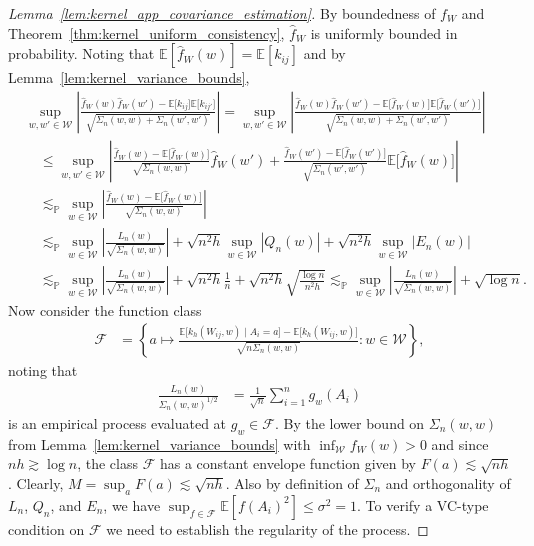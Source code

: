 \documentclass[11pt,lof]{puthesis}
\renewcommand{\P}{\ensuremath{\mathbb{P}}}
\newcommand{\E}{\ensuremath{\mathbb{E}}}
\newcommand{\cF}{\ensuremath{\mathcal{F}}}
\newcommand{\cW}{\ensuremath{\mathcal{W}}}
\theoremstyle{break}
\theoremstyle{proof}
\newtheorem{proof}{Proof}
\begin{document}
\begin{proof}[Lemma~\ref{lem:kernel_app_covariance_estimation}]
By boundedness of $f_W$ and
Theorem~\ref{thm:kernel_uniform_consistency},
$\hat f_W$ is uniformly bounded in probability.
Noting that
$\E[\hat f_W(w)] = \E[k_{i j}]$
and by Lemma~\ref{lem:kernel_variance_bounds},
%
\begin{align*}
&\sup_{w,w' \in \cW}
\left|
\frac{
\hat f_W(w) \hat f_W(w')
- \E\big[k_{i j}\big] \E\big[k_{i j'}\big]}
{\sqrt{\Sigma_n(w,w) + \Sigma_n(w',w')}}
\right|
=
\sup_{w,w' \in \cW}
\left|
\frac{
\hat f_W(w) \hat f_W(w')
- \E\big[\hat f_W(w)\big] \E\big[\hat f_W(w')\big]}
{\sqrt{\Sigma_n(w,w) + \Sigma_n(w',w')}}
\right| \\
&\quad\leq
\sup_{w,w' \in \cW}
\left|
\frac{\hat f_W(w) - \E\big[\hat f_W(w)\big]}
{\sqrt{\Sigma_n(w,w)}}
\hat f_W(w')
+ \frac{\hat f_W(w') - \E\big[\hat f_W(w')\big]}
{\sqrt{\Sigma_n(w',w')}}
\E\big[\hat f_W(w)]
\right| \\
&\quad\lesssim_\P
\sup_{w \in \cW}
\left|
\frac{\hat f_W(w) - \E\big[\hat f_W(w)\big]}
{\sqrt{\Sigma_n(w,w)}}
\right| \\
&\quad\lesssim_\P
\sup_{w \in \cW}
\left|
\frac{L_n(w)}
{\sqrt{\Sigma_n(w,w)}}
\right|
+ \sqrt{n^2h} \sup_{w \in \cW} \left| Q_n(w) \right|
+ \sqrt{n^2h} \sup_{w \in \cW} \left| E_n(w) \right| \\
&\quad\lesssim_\P
\sup_{w \in \cW}
\left|
\frac{L_n(w)}
{\sqrt{\Sigma_n(w,w)}}
\right|
+ \sqrt{n^2h} \frac{1}{n}
+ \sqrt{n^2h} \sqrt{\frac{\log n}{n^2h}}
\lesssim_\P
\sup_{w \in \cW}
\left|
\frac{L_n(w)}
{\sqrt{\Sigma_n(w,w)}}
\right|
+ \sqrt{\log n}.
\end{align*}
%
Now consider the function class
%
\begin{align*}
\cF
&=
\left\{
a \mapsto
\frac{
\E\big[k_h(W_{i j},w) \mid A_i = a \big]
- \E\big[k_h(W_{i j},w) \big]}
{\sqrt{n \Sigma_n(w,w)}}:
w \in \cW
\right\},
\end{align*}
%
noting that
%
\begin{align*}
\frac{L_n(w)}
{\Sigma_n(w,w)^{1/2}}
&=
\frac{1}{\sqrt n}
\sum_{i=1}^n
g_w(A_i)
\end{align*}
%
is an empirical process evaluated at
$g_w \in \cF$.
By the lower bound on $\Sigma_n(w,w)$
from Lemma~\ref{lem:kernel_variance_bounds}
with $\inf_\cW f_W(w) > 0$ and since $n h \gtrsim \log n$,
the class $\cF$ has a constant envelope function
given by $F(a) \lesssim \sqrt{n h}$.
Clearly, $M = \sup_a F(a) \lesssim \sqrt{n h}$.
Also by definition of $\Sigma_n$
and orthogonality of $L_n$, $Q_n$, and $E_n$,
we have
$\sup_{f \in \cF} \E[f(A_i)^2] \leq \sigma^2 = 1$.
To verify a VC-type condition on $\cF$
we need to establish the regularity of the process.

\end{proof}
\end{document}
